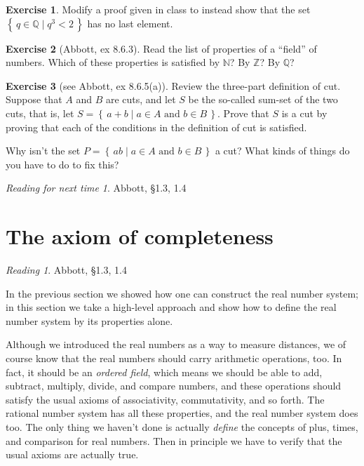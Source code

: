 \documentclass[11pt,oneside]{amsbook}
\newcommand{\set}[1]{\left\{\,#1\,\right\}}
\newcommand{\NN}{\mathbb N}
\newcommand{\ZZ}{\mathbb Z}
\newcommand{\QQ}{\mathbb Q}
\theoremstyle{definition}
\newtheorem{exerc}{Exercise}[section]
\theoremstyle{plain}
\theoremstyle{definition}
\theoremstyle{remark}
\newtheorem*{reading}{Reading}
\newtheorem*{readnext}{Reading for next time}
\numberwithin{equation}{section}
\numberwithin{figure}{section}
\begin{document}
\begin{exerc}
  Modify a proof given in class to instead show that the set
$\set{q\in\QQ\mid q^3<2}$ has no last element.
\end{exerc}

\begin{exerc}[Abbott, ex 8.6.3]
  Read the list of properties of a ``field'' of numbers.  Which of these properties is satisfied by $\NN$?  By $\ZZ$?  By $\QQ$?
\end{exerc}

\begin{exerc}[see Abbott, ex 8.6.5(a)]
  Review the three-part definition of cut. Suppose that $A$ and $B$ are cuts, and let $S$ be the so-called sum-set of the two cuts, that is, let $S=\set{a+b\mid a\in A\text{ and }b\in B}$. Prove that $S$ is a cut by proving that each of the conditions in the definition of cut is satisfied.

  Why isn't the set $P=\set{ab\mid a\in A\text{ and }b\in B}$ a cut?  What kinds of things do you have to do to fix this?
\end{exerc}



\begin{readnext}
  Abbott, \S 1.3, 1.4
\end{readnext}

\newpage
\section{The axiom of completeness}

\begin{reading}
  Abbott, \S 1.3, 1.4
\end{reading}

In the previous section we showed how one can construct the real number system; in this section we take a high-level approach and show how to define the real number system by its properties alone.

Although we introduced the real numbers as a way to measure distances, we of course know that the real numbers should carry arithmetic operations, too. In fact, it should be an \emph{ordered field}, which means we should be able to add, subtract, multiply, divide, and compare numbers, and these operations should satisfy the usual axioms of associativity, commutativity, and so forth. The rational number system has all these properties, and the real number system does too. The only thing we haven't done is actually \emph{define} the concepts of plus, times, and comparison for real numbers. Then in principle we have to verify that the usual axioms are actually true.
\end{document}

